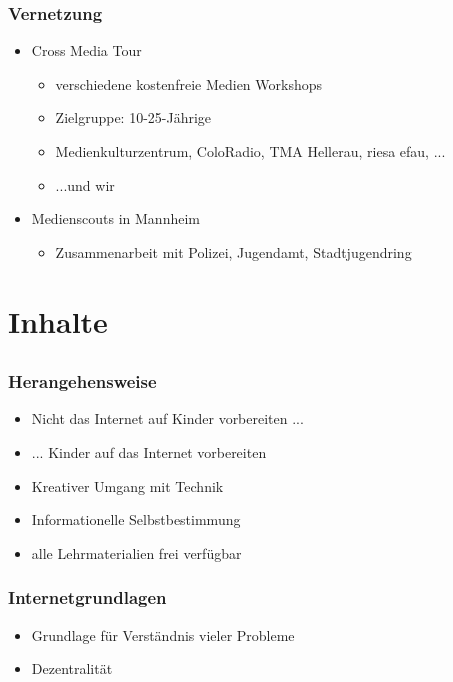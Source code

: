 \documentclass[12pt]{beamer}
\begin{document}
\begin{frame}
  \frametitle{Vernetzung}
  \begin{itemize}
    \item<2-> Cross Media Tour
    \begin{itemize}
      \item<3-> verschiedene kostenfreie Medien Workshops
      \item<4-> Zielgruppe: 10-25-Jährige
      \item<5-> Medienkulturzentrum, ColoRadio, TMA Hellerau, riesa efau, ...
      \item<6-> ...und wir
    \end{itemize}
    \item<7-> Medienscouts in Mannheim
    \begin{itemize}
      \item<7-> Zusammenarbeit mit Polizei, Jugendamt, Stadtjugendring
    \end{itemize}
  \end{itemize}
\end{frame}

\section{Inhalte}
\subsection{}

\begin{frame}
  \frametitle{Herangehensweise}
  \begin{itemize}
    \item<2-> Nicht das Internet auf Kinder vorbereiten ...
    \item<3-> ... Kinder auf das Internet vorbereiten
    \item<4-> Kreativer Umgang mit Technik
    \item<5-> Informationelle Selbstbestimmung
    \item<6-> alle Lehrmaterialien frei verfügbar
  \end{itemize}
\end{frame}

\begin{frame}
  \frametitle{Internetgrundlagen}
  \begin{itemize}
    \item Grundlage für Verständnis vieler Probleme
    \item Dezentralität
  \end{itemize}
\end{frame}
\end{document}
